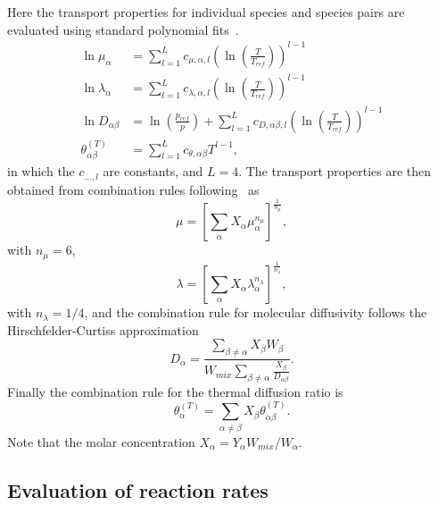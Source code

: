 \documentclass[notitlepage]{revtex4-1}
\begin{document}
Here the transport properties for individual species and species pairs are evaluated using standard polynomial fits~\cite{kee_1986}.
\begin{subequations}\begin{align}
\ln\mu_{\alpha}&=\displaystyle\sum_{l=1}^{L}c_{\mu,\alpha,l}\left(\ln\left(\frac{T}{T_{ref}}\right)\right)^{l-1}\\
\ln\lambda_{\alpha}&=\displaystyle\sum_{l=1}^{L}c_{\lambda,\alpha,l}\left(\ln\left(\frac{T}{T_{ref}}\right)\right)^{l-1}\\
\ln{D}_{\alpha\beta}&=\ln\left(\frac{p_{ref}}{p}\right)+\displaystyle\sum_{l=1}^{L}c_{D,\alpha\beta,l}\left(\ln\left(\frac{T}{T_{ref}}\right)\right)^{l-1}\\
\theta^{\left(T\right)}_{\alpha\beta}&=\displaystyle\sum_{l=1}^{L}c_{\theta,\alpha\beta}T^{l-1},
\end{align}\end{subequations}
in which the $c_{\dots,l}$ are constants, and $L=4$. The transport properties are then obtained from combination rules following~\cite{ern_1994,ern_1995} as
\begin{equation}\mu=\left[\displaystyle\sum_{\alpha}X_{\alpha}\mu_{\alpha}^{n_{\mu}}\right]^{\frac{1}{n_{\mu}}},\end{equation}
with $n_{\mu}=6$, 
\begin{equation}\lambda=\left[\displaystyle\sum_{\alpha}X_{\alpha}\lambda_{\alpha}^{n_{\lambda}}\right]^{\frac{1}{n_{\lambda}}},\end{equation}
with $n_{\lambda}=1/4$, and the combination rule for molecular diffusivity follows the Hirschfelder-Curtiss approximation~\cite{hirschfelder_curtiss}
\begin{equation}D_{\alpha}=\frac{\displaystyle\sum_{\beta\ne\alpha}X_{\beta}{W}_{\beta}}{W_{mix}\displaystyle\sum_{\beta\ne\alpha}\frac{X_{\beta}}{D_{\alpha\beta}}}.\end{equation}
Finally the combination rule for the thermal diffusion ratio is
\begin{equation}\theta^{\left(T\right)}_{\alpha}=\displaystyle\sum_{\alpha\ne\beta}X_{\beta}\theta^{\left(T\right)}_{\alpha\beta}.\end{equation}
Note that the molar concentration $X_{\alpha}=Y_{\alpha}W_{mix}/W_{\alpha}$.


\subsection{Evaluation of reaction rates}
\end{document}
